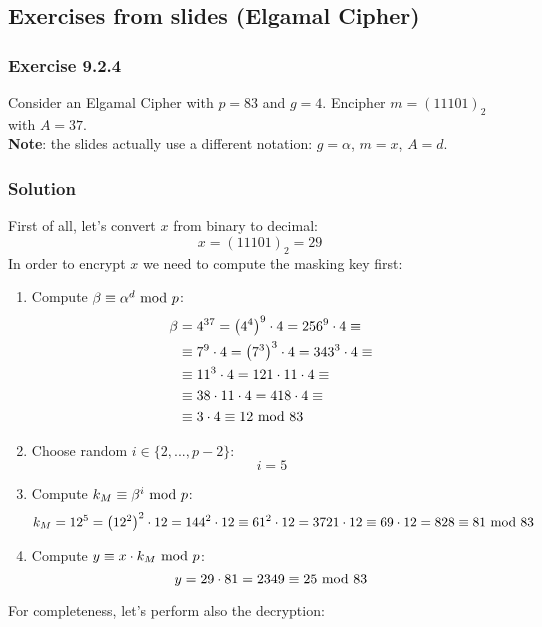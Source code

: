 \newpage
\subsection{Exercises from slides (Elgamal Cipher)}
\subsubsection{Exercise 9.2.4}
Consider an Elgamal Cipher with $p = 83$ and $g = 4$. Encipher $m = (11101)_2$ with $A = 37$.\\
\textbf{Note}: the slides actually use a different notation: $g=\alpha$, $m=x$, $A=d$.
\subsubsection*{Solution}
First of all, let's convert $x$ from binary to decimal:
$$x=(11101)_2=29$$
In order to encrypt $x$ we need to compute the masking key first:
\begin{enumerate}
    \item Compute $\beta\equiv\alpha^d\text{ mod } p$:
    \begin{align*}
        \beta&=4^{37}=\left(4^4\right)^9\cdot4=256^9\cdot4\equiv\\
        &\equiv7^9\cdot4=\left(7^3\right)^3\cdot4=343^3\cdot4\equiv\\
        &\equiv11^3\cdot4=121\cdot11\cdot4\equiv\\
        &\equiv38\cdot11\cdot4=418\cdot4\equiv\\
        &\equiv3\cdot4\equiv12\text{ mod }83
    \end{align*}
    \item Choose random $i\in\{2,...,p-2\}$:
    $$i=5$$
    \item Compute $k_M\equiv\beta^i\text{ mod } p$:    $$k_M=12^5=\left(12^2\right)^2\cdot12=144^2\cdot12\equiv61^2\cdot12=3721\cdot12\equiv69\cdot12=828\equiv81\text{ mod }83$$
    \item Compute $y\equiv x\cdot k_M\text{ mod } p$:
    $$y=29\cdot81=2349\equiv25\text{ mod }83$$
\end{enumerate}
For completeness, let's perform also the decryption:
